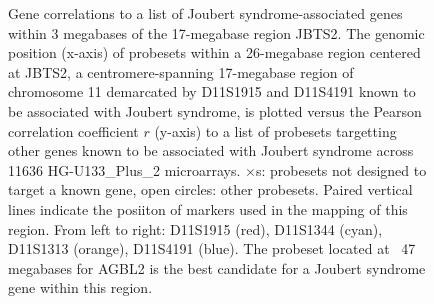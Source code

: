 \documentclass{bioinfo}
\begin{document}

\begin{figure}[!tpb]
\label{figure:JBTS2}
\centerline{}
\caption{Gene correlations to a list of Joubert syndrome-associated genes within 3
megabases of the 17-megabase region JBTS2.  The genomic position (x-axis) of
probesets within a 26-megabase region centered at JBTS2, a centromere-spanning
17-megabase region of chromosome 11 demarcated by D11S1915 and D11S4191 known
to be associated with Joubert syndrome, is plotted versus the Pearson
correlation coefficient $r$ (y-axis) to a list of probesets targetting other
genes known to be associated with Joubert syndrome across 11636
HG-U133\_Plus\_2 microarrays.  $\times$s: probesets not designed to target a
known gene, open circles: other probesets.  Paired vertical lines indicate the
posiiton of markers used in the mapping of this region.  From left to right:
D11S1915 (red), D11S1344 (cyan), D11S1313 (orange), D11S4191 (blue).  The
probeset located at ~47 megabases for AGBL2 is the best candidate for a Joubert
syndrome gene within this region.}
\end{figure}

\end{document}
